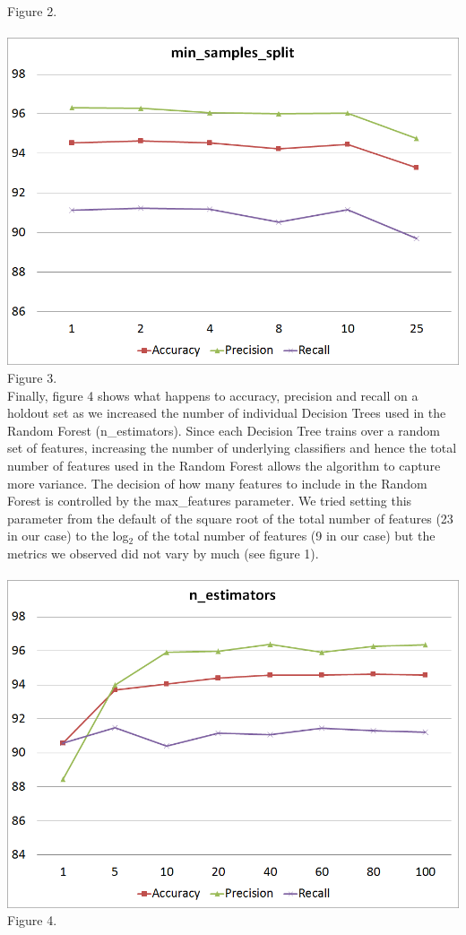 \documentclass[twoside,11pt]{homework}
\begin{document}
\\
Figure 2.
\\
\\
\includegraphics[scale=0.5]{min_split.png}
\\
Figure 3.
\\

Finally, figure 4 shows what happens to accuracy, precision and recall on a holdout set as we increased the 
number of individual Decision Trees used in the Random Forest (n\_estimators). Since each Decision Tree trains
over a random set of features, increasing the number of underlying classifiers and hence the total number of features
used in the Random Forest allows the algorithm to capture more variance. The decision of how many features to include
in the Random Forest is controlled by the max\_features parameter. We tried setting this parameter from the default of the square
root of the total number of features (23 in our case) to the log$_2$ of the total number of features (9 in our case)
but the metrics we observed did not vary by much (see figure 1). 
\\
\\
\includegraphics[scale=0.5]{n_estimators.png}
\\
Figure 4.
\\
\end{document}
